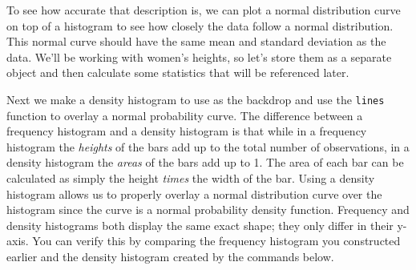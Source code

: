 \documentclass[]{article}
\newenvironment{Shaded}{\begin{snugshade}}{\end{snugshade}}
\newcommand{\KeywordTok}[1]{\textcolor[rgb]{0.13,0.29,0.53}{\textbf{{#1}}}}
\newcommand{\DataTypeTok}[1]{\textcolor[rgb]{0.13,0.29,0.53}{{#1}}}
\newcommand{\DecValTok}[1]{\textcolor[rgb]{0.00,0.00,0.81}{{#1}}}
\newcommand{\StringTok}[1]{\textcolor[rgb]{0.31,0.60,0.02}{{#1}}}
\newcommand{\OtherTok}[1]{\textcolor[rgb]{0.56,0.35,0.01}{{#1}}}
\newcommand{\NormalTok}[1]{{#1}}
\begin{document}
To see how accurate that description is, we can plot a normal
distribution curve on top of a histogram to see how closely the data
follow a normal distribution. This normal curve should have the same
mean and standard deviation as the data. We'll be working with women's
heights, so let's store them as a separate object and then calculate
some statistics that will be referenced later.

\begin{Shaded}
\end{Shaded}

Next we make a density histogram to use as the backdrop and use the
\texttt{lines} function to overlay a normal probability curve. The
difference between a frequency histogram and a density histogram is that
while in a frequency histogram the \emph{heights} of the bars add up to
the total number of observations, in a density histogram the
\emph{areas} of the bars add up to 1. The area of each bar can be
calculated as simply the height \emph{times} the width of the bar. Using
a density histogram allows us to properly overlay a normal distribution
curve over the histogram since the curve is a normal probability density
function. Frequency and density histograms both display the same exact
shape; they only differ in their y-axis. You can verify this by
comparing the frequency histogram you constructed earlier and the
density histogram created by the commands below.

\begin{Shaded}
\end{Shaded}
\end{document}
